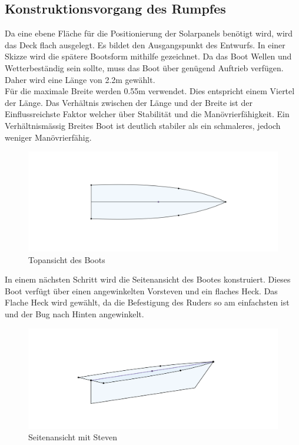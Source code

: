 \subsection{Konstruktionsvorgang des Rumpfes}
Da eine ebene Fläche für die Positionierung der Solarpanels benötigt wird, wird das Deck flach ausgelegt. Es bildet den Ausgangspunkt des Entwurfs. In einer Skizze wird die spätere Bootsform mithilfe gezeichnet. Da das Boot Wellen und Wetterbeständig sein sollte, muss das Boot über genügend Auftrieb verfügen. Daher wird eine Länge von 2.2m gewählt. \\
Für die maximale Breite werden 0.55m verwendet. Dies entspricht einem Viertel der Länge. Das Verhältnis zwischen der Länge und der Breite ist der Einflussreichste Faktor welcher über  Stabilität und die Manövrierfähigkeit. Ein Verhältnismässig Breites Boot ist deutlich stabiler als ein schmaleres, jedoch weniger Manövrierfähig. \cite{Seemannschaft} \\
\begin{figure}[H]
    \centering
    \includegraphics[width=1\linewidth]{assets/boot sketch top.png}
    \caption{Topansicht des Boots}
   
\end{figure}
In einem nächsten Schritt wird die Seitenansicht des Bootes konstruiert. Dieses Boot verfügt über einen angewinkelten Vorsteven und ein flaches Heck. Das Flache Heck wird gewählt, da die Befestigung des Ruders so am einfachsten ist und der Bug nach Hinten angewinkelt.

\begin{figure}[H]
    \centering
    \includegraphics[width=1\linewidth]{assets/boot_skizze_2.png}
    \caption{Seitenansicht mit Steven}
    
\end{figure}

